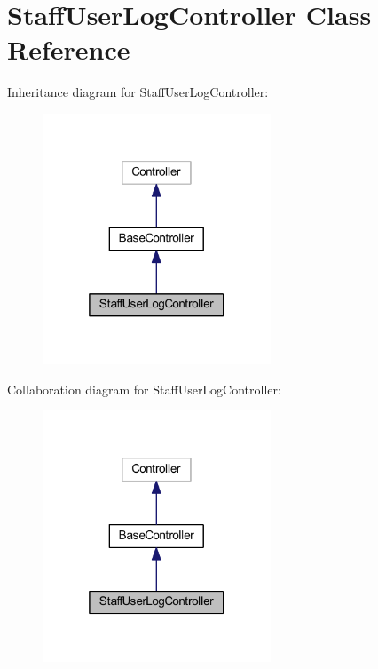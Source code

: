 \hypertarget{class_staff_user_log_controller}{}\section{Staff\+User\+Log\+Controller Class Reference}
\label{class_staff_user_log_controller}


Inheritance diagram for Staff\+User\+Log\+Controller\+:
\nopagebreak
\begin{figure}[H]
\begin{center}
\leavevmode
\includegraphics[width=193pt]{class_staff_user_log_controller__inherit__graph}
\end{center}
\end{figure}


Collaboration diagram for Staff\+User\+Log\+Controller\+:
\nopagebreak
\begin{figure}[H]
\begin{center}
\leavevmode
\includegraphics[width=193pt]{class_staff_user_log_controller__coll__graph}
\end{center}
\end{figure}
